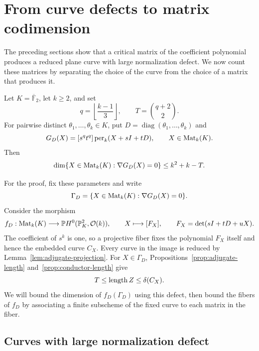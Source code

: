 \section{From curve defects to matrix codimension}
\label{sec:dimension}

The preceding sections show that a critical matrix of the coefficient
polynomial produces a reduced plane curve with large normalization defect.
We now count these matrices by separating the choice of the curve from the
choice of a matrix that produces it.

\begin{samepage}
\begin{proposition}\label{prop:gradient-codimension}
Let $K=\overline{\mathbb F}_2$, let $k\geq2$, and set
\[
 q=\left\lfloor\frac{k-1}{3}\right\rfloor,
 \qquad T=\binom{q+2}{2}.
\]
For pairwise distinct $\theta_1,\ldots,\theta_k\in K$, put
$D=\operatorname{diag}(\theta_1,\ldots,\theta_k)$ and
\[
 G_D(X)=[s^qt^q]\operatorname{per}_k(X+sI+tD),
 \qquad X\in\operatorname{Mat}_k(K).
\]
Then
\begin{equation}
 \dim\{X\in\operatorname{Mat}_k(K):\nabla G_D(X)=0\}
 \leq k^2+k-T.
 \label{eq:gradient-dimension}
\end{equation}
\end{proposition}
\end{samepage}

For the proof, fix these parameters and write
\[
 \Gamma_D=\{X\in\operatorname{Mat}_k(K):\nabla G_D(X)=0\}.
\]
Consider the morphism
\begin{equation}
 \label{eq:determinant-curve-map}
 f_D:\operatorname{Mat}_k(K)\longrightarrow
 \mathbb P H^0(\mathbb P^2_K,\mathcal O(k)),\qquad
 X\longmapsto[F_X],\qquad
 F_X=\det(sI+tD+uX).
\end{equation}
The coefficient of $s^k$ is one, so a projective fiber fixes the
polynomial $F_X$ itself and hence the embedded curve $C_X$.
Every curve in the image is reduced by
Lemma~\ref{lem:adjugate-projection}.  For $X\in\Gamma_D$,
Propositions~\ref{prop:adjugate-length} and~\ref{prop:conductor-length}
give
\begin{equation}
 \label{eq:dimension-gradient-defect}
 T\leq\operatorname{length} Z\leq\delta(C_X).
\end{equation}
We will bound the dimension of $f_D(\Gamma_D)$ using this defect, then
bound the fibers of $f_D$ by associating a finite subscheme of the fixed
curve to each matrix in the fiber.

\subsection{Curves with large normalization defect}

